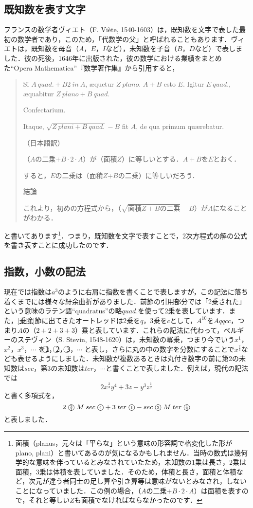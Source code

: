 \documentclass[./main]{subfile}
\begin{document}
\subsection{既知数を表す文字}
フランスの数学者ヴィエト（F. Vi\`ete, 1540-1603）は，既知数を文字で表した最初の数学者であり，このため，「代数学の父」と呼ばれることもあります．ヴィエトは，既知数を母音（$A$，$E$，$I$など），未知数を子音（$B$，$D$など）で表しました．彼の死後，1646年に出版された，彼の数学における業績をまとめた``Opera Mathematica''『数学著作集』から引用すると，
\begin{quote}
Si $A\ quad. +B2\ in\ A$, \ae quetur $Z\ plano$. $A+B$ esto $E$. Igitur $E\ quad.$, \ae quabitur $Z\ plano+B\ quad.$

Confectarium.

Itaque, $\sqrt{Z\ plani+B\ quad.}-B$ fit $A$, de qua primum qu\ae rebatur.\smallskip

（日本語訳）

（$A$の二乗$+B\cdot 2\cdot A$）が（面積$Z$）に等しいとする．$A+B$を$E$とおく．

すると，$E$の二乗は（面積$Z$+$B$の二乗）に等しいだろう．

結論

これより，初めの方程式から，（$\sqrt{\mbox{面積}Z+B\mbox{の二乗}}-B$）が$A$になることがわかる．
\end{quote}
と書いてあります\footnote{面積（planus，元々は「平らな」という意味の形容詞で格変化した形がplano, plani）と書いてあるのが気になるかもしれません．当時の数式は幾何学的な意味を伴っているとみなされていたため，未知数の1乗は長さ，2乗は面積，3乗は体積を表していました．そのため，体積と長さ，面積と体積など，次元が違う者同士の足し算や引き算等は意味がないとみなされ，しないことになっていました．この例の場合，（$A$の二乗$+B\cdot 2\cdot A$）は面積を表すので，それと等しい$Z$も面積でなければならなかったのです．}．つまり，既知数を文字で表すことで，2次方程式の解の公式を書き表すことに成功したのです．

\subsection{指数，小数の記法}
現在では指数は$a^3$のように右肩に指数を書くことで表しますが，この記法に落ち着くまでには様々な紆余曲折がありました．前節の引用部分では「2乗された」という意味のラテン語``quadratus''の略$quad.$を使って2乗を表しています．また，\ref{乗除}節に出てきたオートレッドは2乗を$q$，3乗を$c$として，$A^{10}$を$Aqqcc$，つまり$A$の（$2+2+3+3$）乗と表しています．これらの記法に代わって，ベルギーのステヴィン（S. Stevin, 1548-1620）は，未知数の冪乗，つまり今でいう$x^1$，$x^2$，$x^3$，$\cdots$ を\textcircled{\scriptsize 1}，\textcircled{\scriptsize 2}，\textcircled{\scriptsize 3}，$\cdots$ と表し，さらに丸の中の数字を分数にすることで$x^{\frac{2}{3}}$なども表せるようにしました．未知数が複数あるときは丸付き数字の前に第2の未知数は$sec$，第3の未知数は$ter$，$\cdots$と書くことで表しました．例えば，現代の記法では
\[
2x^{\frac{2}{3}}y^4+3z-y^3z^{\frac{1}{2}}
\]
と書く多項式を，
\[
2\;\mbox{\textcircled{\scriptsize $\frac{2}{3}$}}\;M\;sec\;\mbox{\textcircled{\scriptsize 4}}+3\;ter\;\mbox{\textcircled{\scriptsize 1}}-sec\;\mbox{\textcircled{\scriptsize 3}}\;M\;ter\;\mbox{\textcircled{\scriptsize $\frac{1}{2}$}}
\]
と表しました．
\end{document}
